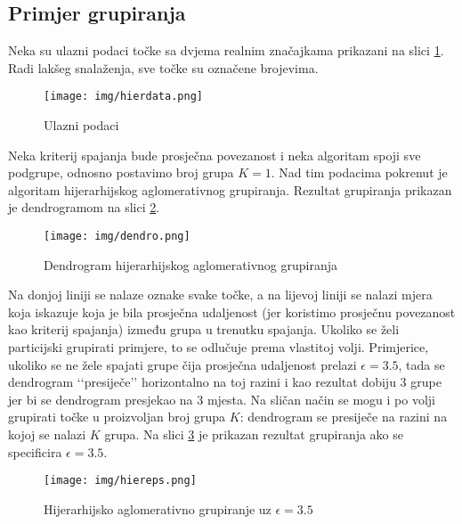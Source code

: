 \documentclass[times, utf8, zavrsni]{fer}
\begin{document}
\subsection{Primjer grupiranja}
Neka su ulazni podaci točke sa dvjema realnim značajkama prikazani na slici \ref{fig:hierdata}. Radi lakšeg snalaženja, sve točke su označene brojevima.
\begin{figure}[H]
    \centering
    \texttt{[image: img/hierdata.png]}
    \caption{Ulazni podaci}
    \label{fig:hierdata}
\end{figure}
Neka kriterij spajanja bude prosječna povezanost i neka algoritam spoji sve podgrupe, odnosno postavimo broj grupa $K = 1$. Nad tim podacima pokrenut je algoritam hijerarhijskog aglomerativnog grupiranja. Rezultat grupiranja prikazan je dendrogramom na slici \ref{fig:dendrogram}.
\begin{figure}[H]
    \centering
    \texttt{[image: img/dendro.png]}
    \caption{Dendrogram hijerarhijskog aglomerativnog grupiranja}
    \label{fig:dendrogram}
\end{figure}
Na donjoj liniji se nalaze oznake svake točke, a na lijevoj liniji se nalazi mjera koja iskazuje koja je bila prosječna udaljenost (jer koristimo prosječnu povezanost kao kriterij spajanja) između grupa u trenutku spajanja. Ukoliko se želi particijski grupirati primjere, to se odlučuje prema vlastitoj volji. Primjerice, ukoliko se ne žele spajati grupe čija prosječna udaljenost prelazi $\epsilon = 3.5$, tada se dendrogram ‘‘presiječe’’ horizontalno na toj razini i kao rezultat dobiju 3 grupe jer bi se dendrogram presjekao na 3 mjesta. Na sličan način se mogu i po volji grupirati točke u proizvoljan broj grupa $K$: dendrogram se presiječe na razini na kojoj se nalazi $K$ grupa. Na slici \ref{fig:hiereps} je prikazan rezultat grupiranja ako se specificira $\epsilon = 3.5$.
\begin{figure}[H]
    \centering
    \texttt{[image: img/hiereps.png]}
    \caption{Hijerarhijsko aglomerativno grupiranje uz $\epsilon = 3.5$}
    \label{fig:hiereps}
\end{figure}
\end{document}
